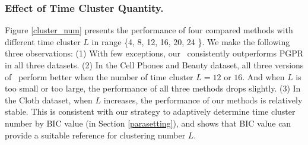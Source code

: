 \subsubsection{\textbf{Effect of Time Cluster Quantity.}}
Figure \ref{cluster_num} presents the performance of four compared methods with different time 
cluster $L$ in range \{4, 8, 12, 16, 20, 24 \}. We make the following three observations: (1) With few exceptions, our \tkgrec\ consistently outperforms PGPR in all three datasets. 
(2) In the Cell Phones and Beauty dataset, all three versions of \tkgrec\ perform better when the number of time cluster $L = 12$ or $16$. And when $L$ is too small or too large, the performance of all three methods drops slightly.  
(3) In the Cloth dataset, when $L$ increases, the performance of our methods is relatively stable.
This is consistent with our strategy to adaptively determine time cluster number by BIC value (in Section \ref{parasetting}), and shows that BIC value can provide a suitable reference for clustering number $L$. 
%
%
